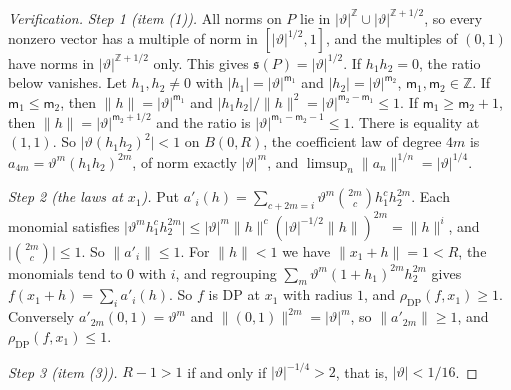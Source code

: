 \documentclass[11pt]{amsart}
\theoremstyle{definition}
\theoremstyle{remark}
\numberwithin{equation}{section}
\newcommand{\Z}{\mathbb Z}
\newcommand{\abs}[1]{\lvert #1\rvert}
\newcommand{\norm}[1]{\lVert #1\rVert}
\theoremstyle{plain}
\theoremstyle{definition}
\theoremstyle{plain}
\begin{document}
\begin{proof}[Verification]
\emph{Step 1 (item (1)).} All norms on $P$ lie in $\abs\vartheta^{\Z}\cup\abs\vartheta^{\Z+1/2}$, so every nonzero vector has a multiple of norm in $[\abs\vartheta^{1/2},1]$, and the multiples of $(0,1)$ have norms in $\abs\vartheta^{\Z+1/2}$ only. This gives $\mathfrak s(P)=\abs\vartheta^{1/2}$. If $h_1h_2=0$, the ratio below vanishes. Let $h_1,h_2\ne0$ with $\abs{h_1}=\abs\vartheta^{\mathsf m_1}$ and $\abs{h_2}=\abs\vartheta^{\mathsf m_2}$, $\mathsf m_1,\mathsf m_2\in\Z$. If $\mathsf m_1\le\mathsf m_2$, then $\norm h=\abs\vartheta^{\mathsf m_1}$ and $\abs{h_1h_2}/\norm h^2=\abs\vartheta^{\mathsf m_2-\mathsf m_1}\le1$. If $\mathsf m_1\ge\mathsf m_2+1$, then $\norm h=\abs\vartheta^{\mathsf m_2+1/2}$ and the ratio is $\abs\vartheta^{\mathsf m_1-\mathsf m_2-1}\le1$. There is equality at $(1,1)$. So $\abs{\vartheta(h_1h_2)^2}<1$ on $B(0,R)$, the coefficient law of degree $4m$ is $a_{4m}=\vartheta^m(h_1h_2)^{2m}$, of norm exactly $\abs\vartheta^m$, and $\limsup_n\norm{a_n}^{1/n}=\abs\vartheta^{1/4}$.

\emph{Step 2 (the laws at $x_1$).} Put $a'_i(h)=\sum_{c+2m=i}\vartheta^m\binom{2m}ch_1^ch_2^{2m}$. Each monomial satisfies $\abs{\vartheta^mh_1^ch_2^{2m}}\le\abs\vartheta^m\norm h^c(\abs\vartheta^{-1/2}\norm h)^{2m}=\norm h^i$, and $\abs{\binom{2m}c}\le1$. So $\norm{a'_i}\le1$. For $\norm h<1$ we have $\norm{x_1+h}=1<R$, the monomials tend to $0$ with $i$, and regrouping $\sum_m\vartheta^m(1+h_1)^{2m}h_2^{2m}$ gives $f(x_1+h)=\sum_ia'_i(h)$. So $f$ is DP at $x_1$ with radius $1$, and $\rho_{\mathrm{DP}}(f,x_1)\ge1$. Conversely $a'_{2m}(0,1)=\vartheta^m$ and $\norm{(0,1)}^{2m}=\abs\vartheta^m$, so $\norm{a'_{2m}}\ge1$, and $\rho_{\mathrm{DP}}(f,x_1)\le1$.

\emph{Step 3 (item (3)).} $R-1>1$ if and only if $\abs\vartheta^{-1/4}>2$, that is, $\abs\vartheta<1/16$.
\end{proof}
\end{document}
